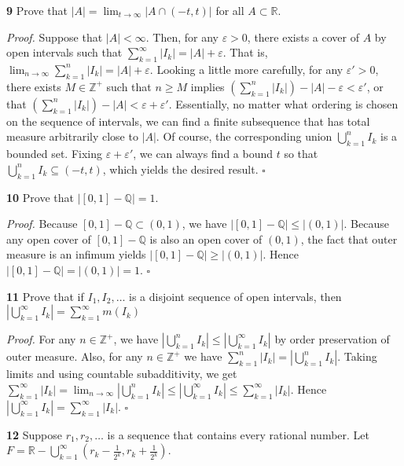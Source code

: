 \documentclass[a4paper]{article}
\newcommand{\R}{\mathbb{R}}
\newcommand{\Q}{\mathbb{Q}}
\newcommand{\Z}{\mathbb{Z}}
\begin{document}
\textbf{9} Prove that $|A| = \lim_{t \to \infty} |A \cap (-t, t)|$ for all $A \subset \R$.

\emph{Proof.} Suppose that $|A| < \infty$. Then, for any $\varepsilon > 0$, there exists a cover of $A$ by open intervals such that $\displaystyle \sum_{k=1}^\infty |I_k| = |A| + \varepsilon$. That is, $\displaystyle \lim_{n \to \infty} \sum_{k=1}^n |I_k| = |A| + \varepsilon$. Looking a little more carefully, for any $\varepsilon' > 0$, there exists $M \in \Z^+$ such that $n \geq M$ implies $\displaystyle \left(\sum_{k=1}^n |I_k|\right) - |A| - \varepsilon < \varepsilon'$, or that $\displaystyle \left(\sum_{k=1}^n |I_k|\right) - |A| < \varepsilon + \varepsilon'$. Essentially, no matter what ordering is chosen on the sequence of intervals, we can find a finite subsequence that has total measure arbitrarily close to $|A|$. Of course, the corresponding union $\bigcup_{k=1}^n I_k$ is a bounded set. Fixing $\varepsilon + \varepsilon'$, we can always find a bound $t$ so that $\bigcup_{k=1}^n I_k \subseteq (-t, t)$, which yields the desired result. $\square$

\textbf{10} Prove that $|[0, 1] - \Q| = 1$.

\emph{Proof.} Because $[0, 1] - \Q \subset (0, 1)$, we have $|[0, 1] - \Q| \leq |(0, 1)|$. Because any open cover of $[0, 1] - \Q$ is also an open cover of $(0, 1)$, the fact that outer measure is an infimum yields $|[0, 1] - \Q| \geq |(0, 1)|$. Hence $|[0, 1] - \Q| = |(0, 1)| = 1$. $\square$

\textbf{11} Prove that if $I_1, I_2, \ldots$ is a disjoint sequence of open intervals, then $\left|\bigcup_{k=1}^\infty I_k\right| = \sum_{k=1}^\infty m(I_k)$

\emph{Proof.} For any $n \in \Z^+$, we have $\displaystyle \left|\bigcup_{k=1}^n I_k\right| \leq \left|\bigcup_{k=1}^\infty I_k\right|$ by order preservation of outer measure. Also, for any $n \in \Z^+$ we have $\sum_{k=1}^n |I_k| = \left|\bigcup_{k=1}^n I_k\right|$. Taking limits and using countable subadditivity, we get $\displaystyle \sum_{k=1}^\infty |I_k| = \lim_{n \to \infty} \left|\bigcup_{k=1}^n I_k\right| \leq \left|\bigcup_{k=1}^\infty I_k\right| \leq \sum_{k=1}^\infty |I_k|$. Hence $\displaystyle \left|\bigcup_{k=1}^\infty I_k\right| = \sum_{k=1}^\infty |I_k|$. $\square$

\textbf{12} Suppose $r_1, r_2, \ldots$ is a sequence that contains every rational number. Let $F = \R - \bigcup_{k=1}^\infty \left(r_k - \frac{1}{2^k}, r_k + \frac{1}{2^k}\right)$.
\end{document}
